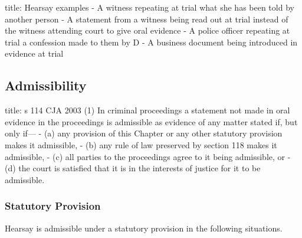 \documentclass[
]{article}
\newenvironment{Shaded}{}{}
\newcommand{\NormalTok}[1]{#1}
\begin{document}
\begin{Shaded}
\begin{Highlighting}[]
\NormalTok{title: Hearsay examples}
\NormalTok{{-} A witness repeating at trial what she has been told by another person}
\NormalTok{{-} A statement from a witness being read out at trial instead of the witness attending court to give oral evidence}
\NormalTok{{-} A police officer repeating at trial a confession made to them by D}
\NormalTok{{-} A business document being introduced in evidence at trial}
\end{Highlighting}
\end{Shaded}

\hypertarget{admissibility}{%
\subsection{Admissibility}\label{admissibility}}

\begin{Shaded}
\begin{Highlighting}[]
\NormalTok{title: s 114 CJA 2003}
\NormalTok{(1) In criminal proceedings a statement not made in oral evidence in the proceedings is admissible as evidence of any matter stated if, but only if—}
\NormalTok{{-} (a) any provision of this Chapter or any other statutory provision makes it admissible,}
\NormalTok{{-} (b) any rule of law preserved by section 118 makes it admissible,}
\NormalTok{{-} (c) all parties to the proceedings agree to it being admissible, or}
\NormalTok{{-} (d) the court is satisfied that it is in the interests of justice for it to be admissible.}
\end{Highlighting}
\end{Shaded}

\hypertarget{statutory-provision}{%
\subsubsection{Statutory Provision}\label{statutory-provision}}

Hearsay is admissible under a statutory provision in the following
situations.
\end{document}
